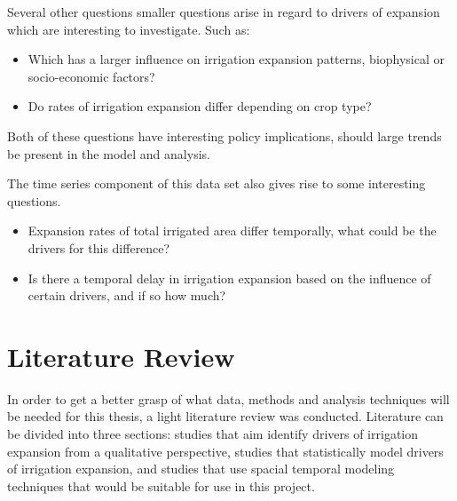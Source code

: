 \documentclass[12pt]{extarticle}
\begin{document}
Several other questions smaller questions arise in regard to drivers of expansion which are interesting to investigate. Such as:
\begin{center}
\begin{itemize}
    \item Which has a larger influence on irrigation expansion patterns, biophysical or socio-economic factors?
    \item Do rates of irrigation expansion differ depending on crop type? 
\end{itemize}
\end{center}
Both of these questions have interesting policy implications, should large trends be present in the model and analysis. 

The time series component of this data set also gives rise to some interesting questions.
\begin{center}
\begin{itemize}
    \item Expansion rates of total irrigated area differ temporally, what could be the drivers for this difference? 
    \item Is there a temporal delay in irrigation expansion based on the influence of certain drivers, and if so how much?
\end{itemize}
\end{center}

\section{Literature Review}
In order to get a better grasp of what data, methods and analysis techniques will be needed for this thesis, a light literature review was conducted. Literature can be divided into three sections: studies that aim identify drivers of irrigation expansion from a qualitative perspective, studies that statistically model drivers of irrigation expansion, and studies that use spacial temporal modeling techniques that would be suitable for use in this project. 
\end{document}
